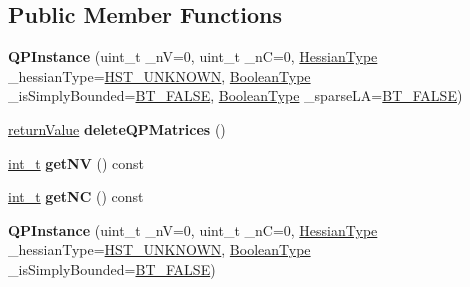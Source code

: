 \subsection*{Public Member Functions}
\begin{DoxyCompactItemize}
\item 
\mbox{\label{class_q_p_instance_aec0255fc8b11c7c82e5ddf3288e3bd45}} 
{\bfseries Q\+P\+Instance} (uint\+\_\+t \+\_\+nV=0, uint\+\_\+t \+\_\+nC=0, \hyperlink{_types_8hpp_a604cad5cda14e378ce4a77ab28ee9fd9}{Hessian\+Type} \+\_\+hessian\+Type=\hyperlink{_types_8hpp_a604cad5cda14e378ce4a77ab28ee9fd9a3479cf4e632ae731d4da9bf57a9f8907}{H\+S\+T\+\_\+\+U\+N\+K\+N\+O\+WN}, \hyperlink{_types_8hpp_a20f82124c82b6f5686a7fce454ef9089}{Boolean\+Type} \+\_\+is\+Simply\+Bounded=\hyperlink{_types_8hpp_a20f82124c82b6f5686a7fce454ef9089a85b8a20e72a8bea5dd10a6007fe3071e}{B\+T\+\_\+\+F\+A\+L\+SE}, \hyperlink{_types_8hpp_a20f82124c82b6f5686a7fce454ef9089}{Boolean\+Type} \+\_\+sparse\+LA=\hyperlink{_types_8hpp_a20f82124c82b6f5686a7fce454ef9089a85b8a20e72a8bea5dd10a6007fe3071e}{B\+T\+\_\+\+F\+A\+L\+SE})
\item 
\mbox{\label{class_q_p_instance_af2417bf8fe23b4529f88435d6060c383}} 
\hyperlink{_message_handling_8hpp_a81d556f613bfbabd0b1f9488c0fa865e}{return\+Value} {\bfseries delete\+Q\+P\+Matrices} ()
\item 
\mbox{\label{class_q_p_instance_abdc92abae38e792c8acf6da6380644c0}} 
\hyperlink{_types_8hpp_ab6fd6105e64ed14a0c9281326f05e623}{int\+\_\+t} {\bfseries get\+NV} () const
\item 
\mbox{\label{class_q_p_instance_a8051c9dccc96f83aedb2847a13ab8346}} 
\hyperlink{_types_8hpp_ab6fd6105e64ed14a0c9281326f05e623}{int\+\_\+t} {\bfseries get\+NC} () const
\item 
\mbox{\label{class_q_p_instance_a3529075c037f56c2f4066817d53d2e88}} 
{\bfseries Q\+P\+Instance} (uint\+\_\+t \+\_\+nV=0, uint\+\_\+t \+\_\+nC=0, \hyperlink{_types_8hpp_a604cad5cda14e378ce4a77ab28ee9fd9}{Hessian\+Type} \+\_\+hessian\+Type=\hyperlink{_types_8hpp_a604cad5cda14e378ce4a77ab28ee9fd9a3479cf4e632ae731d4da9bf57a9f8907}{H\+S\+T\+\_\+\+U\+N\+K\+N\+O\+WN}, \hyperlink{_types_8hpp_a20f82124c82b6f5686a7fce454ef9089}{Boolean\+Type} \+\_\+is\+Simply\+Bounded=\hyperlink{_types_8hpp_a20f82124c82b6f5686a7fce454ef9089a85b8a20e72a8bea5dd10a6007fe3071e}{B\+T\+\_\+\+F\+A\+L\+SE})

\end{DoxyCompactItemize}
